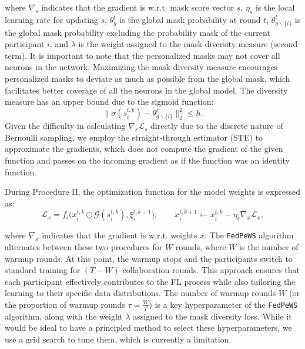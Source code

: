 \documentclass{article}
\begin{document}
where $\nabla_{s}$ indicates that the gradient is w.r.t. mask score vector $s$, $\eta_s$ is the local learning rate for updating $s$, $\theta_g^t$ is the global mask probability at round $t$, $\theta_{g \backslash \{i\}}^t$ is the global mask probability excluding the probability mask of the current participant $i$, and $\lambda$ is the weight assigned to the mask diversity measure (second term). It is important to note that the personalized masks may not cover all neurons in the network. Maximizing the mask diversity measure encourages personalized masks to deviate as much as possible from the global mask, which facilitates better coverage of all the neurons in the global model. The diversity measure has an upper bound due to the sigmoid function: 
\begin{equation}
    \|\sigma\left(s_{i}^{t,k}\right) - \theta_{g \backslash \{i\}}^{t}\|_2^2 \leq h. 
\end{equation}
\noindent Given the difficulty in calculating $\nabla_s \mathcal{L}_s$ directly due to the discrete nature of Bernoulli sampling, we employ the straight-through estimator (STE) \citep{bengio2013STE} to approximate the gradients, which does not compute the gradient of the given function and passes on the incoming gradient as if the function was an identity function.

During Procedure II, the optimization function for the model weights is expressed as: 
\begin{equation}
    \mathcal{L}_x = f_i\Big(x_i^{t,k} \odot \mathcal{G}\left(s_i^{t,k}\right), \xi_i^{t,k-1}\Big); \qquad x_{i}^{t,k+1} \gets x_{i}^{t,k} - \eta_{\ell} \nabla_{x} \mathcal{L}_x,
\end{equation}

where $\nabla_{x}$ indicates that the gradient is w.r.t. weights $x$. The \texttt{FedPeWS} algorithm alternates between these two procedures for $W$ rounds, where $W$ is the number of warmup rounds. 
At this point, the warmup stops and the participants switch to standard training for $(T-W)$ collaboration rounds. 
This approach ensures that each participant effectively contributes to the FL process while also tailoring the learning to their specific data distributions. The number of warmup rounds $W$ (or the proportion of warmup rounds $\tau = \frac{W}{T}$) is a key hyperparameter of the \texttt{FedPeWS} algorithm, along with the weight $\lambda$ assigned to the mask diversity loss. While it would be ideal to have a principled method to select these hyperparameters, we use a grid search to tune them, which is currently a limitation.
\end{document}
